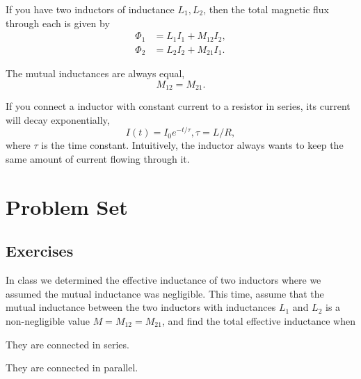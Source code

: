 \documentclass[11pt]{scrartcl}
\begin{document}
\begin{defn}
    If you have two inductors of inductance $L_1,L_2$, then the total magnetic flux through each is given by
    \begin{align*}
    \Phi_1 &= L_1I_1 +M_{12}I_2,\\
        \Phi_2 &= L_2 I_2 + M_{21}I_1.
\end{align*}
\end{defn}

\begin{theorem}
    The mutual inductances are always equal,
    $$M_{12} = M_{21}.$$
\end{theorem}

\begin{idea}[LR Circuits]
    If you connect a inductor with constant current to a resistor in series, its current will decay exponentially,
    $$I(t) = I_0 e^{-t/\tau} , \tau = L/R,$$
    where $\tau$ is the time constant. Intuitively, the inductor always wants to keep the same amount of current flowing through it.
\end{idea}


\section{Problem Set}

\subsection{Exercises}


\begin{prob}
    In class we determined the effective inductance of two inductors where we assumed the mutual inductance was negligible. This time, assume that the mutual inductance between the two inductors with inductances $L_1$ and $L_2$ is a non-negligible value $M = M_{12} = M_{21}$, and find the total effective inductance when
    \begin{anum}
        \item They are connected in series.
        \item They are connected in parallel.
    \end{anum}
\end{prob}
\end{document}
